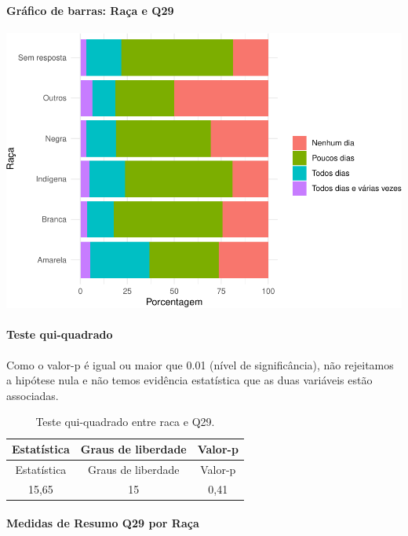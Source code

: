 \documentclass[]{article}
\let\oldparagraph\paragraph
\renewcommand{\paragraph}[1]{\oldparagraph{#1}\mbox{}}
\begin{document}
\hypertarget{gruxe1fico-de-barras-rauxe7a-e-q29}{%
\paragraph{Gráfico de barras: Raça e Q29}\label{gruxe1fico-de-barras-rauxe7a-e-q29}}

\begin{center}\includegraphics[width=0.75\linewidth]{relatorio_covid19_files/figure-latex/unnamed-chunk-928-1} \end{center}

\hypertarget{teste-qui-quadrado-80}{%
\paragraph{Teste qui-quadrado}\label{teste-qui-quadrado-80}}

Como o valor-p é igual ou maior que 0.01 (nível de significância), não rejeitamos a hipótese nula e não temos evidência estatística que as duas variáveis estão associadas.

\begin{longtable}[]{@{}ccc@{}}
\caption{\label{tab:unnamed-chunk-930}Teste qui-quadrado entre raca e Q29.}\tabularnewline
\toprule
Estatística & Graus de liberdade & Valor-p\tabularnewline
\midrule
\endfirsthead
\toprule
Estatística & Graus de liberdade & Valor-p\tabularnewline
\midrule
\endhead
15,65 & 15 & 0,41\tabularnewline
\bottomrule
\end{longtable}

\cleardoublepage

\hypertarget{medidas-de-resumo-q29-por-rauxe7a}{%
\paragraph{Medidas de Resumo Q29 por Raça}\label{medidas-de-resumo-q29-por-rauxe7a}}
\end{document}
